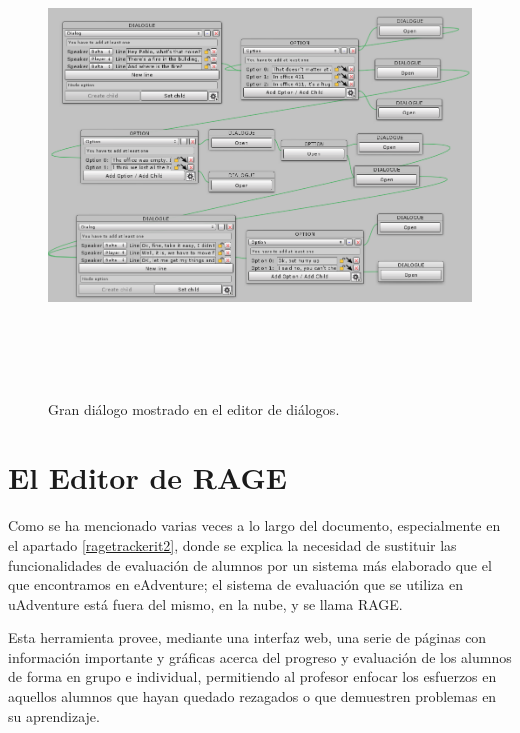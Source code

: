 \begin{figure}[h!]
	\centerline{\includegraphics[height=5in]{figures/it3/big-dialog.png}}
	\caption[Gran diálogo - Editor de Diálogos]{Gran diálogo mostrado en el editor de diálogos.}
	\label{big-dialog-it3}
\end{figure}

\newpage

\newpage

\section{El Editor de RAGE}
\label{rageeditorit3}

Como se ha mencionado varias veces a lo largo del documento, especialmente en el apartado \ref{ragetrackerit2}, donde se explica la necesidad de sustituir las funcionalidades de evaluación de alumnos por un sistema más elaborado que el que encontramos en eAdventure; el sistema de evaluación que se utiliza en uAdventure está fuera del mismo, en la nube, y se llama RAGE.

Esta herramienta provee, mediante una interfaz web, una serie de páginas con información importante y gráficas acerca del progreso y evaluación de los alumnos de forma en grupo e individual, permitiendo al profesor enfocar los esfuerzos en aquellos alumnos que hayan quedado rezagados o que demuestren problemas en su aprendizaje.


